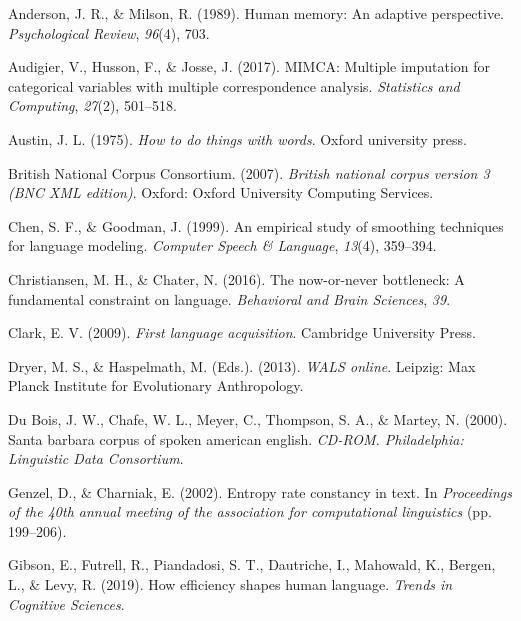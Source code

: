 \documentclass[10pt, letterpaper]{article}
\begin{document}
\setlength{\parindent}{-0.1in} 
\setlength{\leftskip}{0.125in}

\noindent

\hypertarget{refs}{}
\begin{cslreferences}
\leavevmode\hypertarget{ref-anderson1989}{}%
Anderson, J. R., \& Milson, R. (1989). Human memory: An adaptive
perspective. \emph{Psychological Review}, \emph{96}(4), 703.

\leavevmode\hypertarget{ref-audigier2017}{}%
Audigier, V., Husson, F., \& Josse, J. (2017). MIMCA: Multiple
imputation for categorical variables with multiple correspondence
analysis. \emph{Statistics and Computing}, \emph{27}(2), 501--518.

\leavevmode\hypertarget{ref-austin1975}{}%
Austin, J. L. (1975). \emph{How to do things with words}. Oxford
university press.

\leavevmode\hypertarget{ref-british-national-corpus-consortium2007}{}%
British National Corpus Consortium. (2007). \emph{British national
corpus version 3 (BNC XML edition)}. Oxford: Oxford University Computing
Services.

\leavevmode\hypertarget{ref-chen1999}{}%
Chen, S. F., \& Goodman, J. (1999). An empirical study of smoothing
techniques for language modeling. \emph{Computer Speech \& Language},
\emph{13}(4), 359--394.

\leavevmode\hypertarget{ref-christiansen2016}{}%
Christiansen, M. H., \& Chater, N. (2016). The now-or-never bottleneck:
A fundamental constraint on language. \emph{Behavioral and Brain
Sciences}, \emph{39}.

\leavevmode\hypertarget{ref-clark2009}{}%
Clark, E. V. (2009). \emph{First language acquisition}. Cambridge
University Press.

\leavevmode\hypertarget{ref-2013}{}%
Dryer, M. S., \& Haspelmath, M. (Eds.). (2013). \emph{WALS online}.
Leipzig: Max Planck Institute for Evolutionary Anthropology.

\leavevmode\hypertarget{ref-sbc}{}%
Du Bois, J. W., Chafe, W. L., Meyer, C., Thompson, S. A., \& Martey, N.
(2000). Santa barbara corpus of spoken american english. \emph{CD-ROM.
Philadelphia: Linguistic Data Consortium}.

\leavevmode\hypertarget{ref-genzel2002}{}%
Genzel, D., \& Charniak, E. (2002). Entropy rate constancy in text. In
\emph{Proceedings of the 40th annual meeting of the association for
computational linguistics} (pp. 199--206).

\leavevmode\hypertarget{ref-gibson2019}{}%
Gibson, E., Futrell, R., Piandadosi, S. T., Dautriche, I., Mahowald, K.,
Bergen, L., \& Levy, R. (2019). How efficiency shapes human language.
\emph{Trends in Cognitive Sciences}.


\end{cslreferences}
\end{document}
